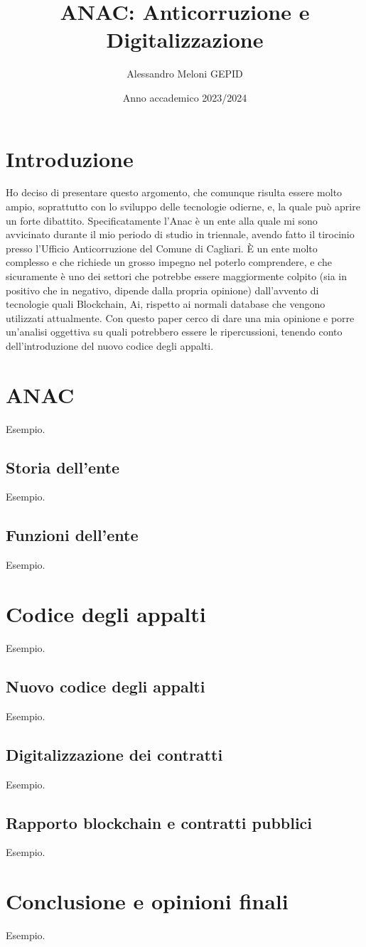 \documentclass{article}
\title{ANAC: Anticorruzione e Digitalizzazione}
\author{Alessandro Meloni GEPID}
\date{Anno accademico 2023/2024}
\begin{document}
\maketitle

\centering \tableofcontents
\newpage\centering
\section{Introduzione}
\flushleft 
\begin{justify}
Ho deciso di presentare questo argomento, che comunque risulta essere molto ampio, soprattutto con lo sviluppo delle tecnologie odierne, e, la quale può aprire un forte dibattito. Specificatamente l'Anac è un ente alla quale mi sono avvicinato durante il mio periodo di studio in triennale, avendo fatto il tirocinio presso l'Ufficio Anticorruzione del Comune di Cagliari. È un ente molto complesso e che richiede un grosso impegno nel poterlo comprendere, e che sicuramente è uno dei settori che potrebbe essere maggiormente colpito (sia in positivo che in negativo, dipende dalla propria opinione) dall'avvento di tecnologie quali Blockchain, Ai, rispetto ai normali database che vengono utilizzati attualmente. Con questo paper cerco di dare una mia opinione e porre un'analisi oggettiva su quali potrebbero essere le ripercussioni, tenendo conto dell'introduzione del nuovo codice degli appalti.
\end{justify}
\newpage\centering
\section{ANAC}
\flushleft Esempio.

\flushleft \subsection{Storia dell'ente}
Esempio.
\flushleft \subsection{Funzioni dell'ente}
Esempio.
\newpage\centering
\section{Codice degli appalti}
\flushleft Esempio.

\flushleft \subsection{Nuovo codice degli appalti}
Esempio.
\flushleft \subsection{Digitalizzazione dei contratti}
Esempio.
\flushleft \subsection{Rapporto blockchain e contratti pubblici}
Esempio.

\newpage \centering
\section{Conclusione e opinioni finali}
\flushleft Esempio.
\end{document}
